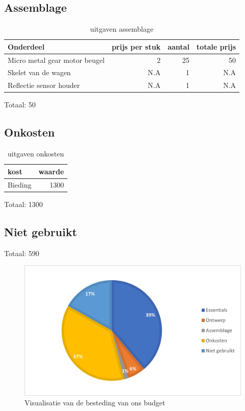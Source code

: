 \documentclass[a4paper,twoside,kulak]{kulakreport}
\begin{document}
	
	\subsection*{Assemblage}
\begin{table}[h]	
	\begin{tabular}{l|r|r|r}
		Onderdeel& prijs per stuk & aantal & totale prijs \\
		\hline
		Micro metal gear motor beugel &2 & 25 & 50 \\
		Skelet van de wagen &N.A & 1 & N.A\\
		Reflectie sensor houder &N.A & 1 & N.A\\
		
	\end{tabular}
	
	Totaal: 50
	
\caption{uitgaven assemblage}
\label{tab: ass}
\end{table}
	\subsection*{Onkosten}

\begin{table}[h]

	\begin{tabular}{l|r}
		kost& waarde \\
		\hline
		Bieding &1300 \\
		
		
	\end{tabular}
	\newline
	Totaal: 1300
\caption{uitgaven onkosten}
\label{tab: onk}
\end{table}
	
	\subsection*{Niet gebruikt}
	Totaal: 590
	
\begin{figure}[h]
	\centering
	\includegraphics[width=1.2\textwidth]{pie}
	\caption{Visualisatie van de besteding van ons budget }
	\label{fig: pie}
\end{figure}
	
	
	
	
	
	
	
	
	
	
	
	
	
\end{document}
